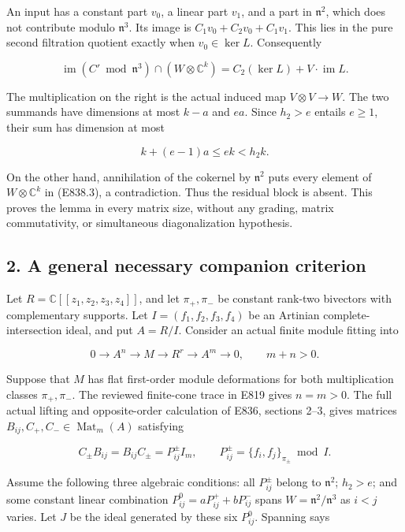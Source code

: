 An input has a constant part \(v_0\), a linear part \(v_1\), and a part
in \(\mathfrak n^2\), which does not contribute modulo
\(\mathfrak n^3\). Its image is \(C_1v_0+C_2v_0+C_1v_1\). This lies in
the pure second filtration quotient exactly when \(v_0\in\ker L\).
Consequently

\[
 \operatorname{im}(C'\bmod\mathfrak n^3)\cap(W\otimes\mathbb C^k)
   =C_2(\ker L)+V\cdot\operatorname{im}L.
 \tag{E838.3}
\]

The multiplication on the right is the actual induced map
\(V\otimes V\to W\). The two summands have dimensions at most \(k-a\)
and \(ea\). Since \(h_2>e\) entails \(e\ge1\), their sum has dimension
at most

\[
 k+(e-1)a\le ek<h_2k.
 \tag{E838.4}
\]

On the other hand, annihilation of the cokernel by \(\mathfrak n^2\)
puts every element of \(W\otimes\mathbb C^k\) in (E838.3), a
contradiction. Thus the residual block is absent. This proves the lemma
in every matrix size, without any grading, matrix commutativity, or
simultaneous diagonalization hypothesis.

\subsection{2. A general necessary companion
criterion}\label{a-general-necessary-companion-criterion}

Let \(R=\mathbb C[[z_1,z_2,z_3,z_4]]\), and let \(\pi_+,\pi_-\) be
constant rank-two bivectors with complementary supports. Let
\(I=(f_1,f_2,f_3,f_4)\) be an Artinian complete-intersection ideal, and
put \(A=R/I\). Consider an actual finite module fitting into

\[
 0\longrightarrow A^n\longrightarrow M\longrightarrow R^r
       \longrightarrow A^m\longrightarrow0,\qquad m+n>0.
 \tag{E838.5}
\]

Suppose that \(M\) has flat first-order module deformations for both
multiplication classes \(\pi_+,\pi_-\). The reviewed finite-cone trace
in E819 gives \(n=m>0\). The full actual lifting and opposite-order
calculation of E836, sections 2--3, gives matrices
\(B_{ij},C_+,C_-\in\operatorname{Mat}_m(A)\) satisfying

\[
 C_\pm B_{ij}=B_{ij}C_\pm=P^\pm_{ij}I_m,
 \qquad P^\pm_{ij}=\{f_i,f_j\}_{\pi_\pm}\bmod I.
 \tag{E838.6}
\]

Assume the following three algebraic conditions: all \(P^\pm_{ij}\)
belong to \(\mathfrak n^2\); \(h_2>e\); and some constant linear
combination \(P^0_{ij}=aP^+_{ij}+bP^-_{ij}\) spans
\(W=\mathfrak n^2/\mathfrak n^3\) as \(i<j\) varies. Let \(J\) be the
ideal generated by these six \(P^0_{ij}\). Spanning says


